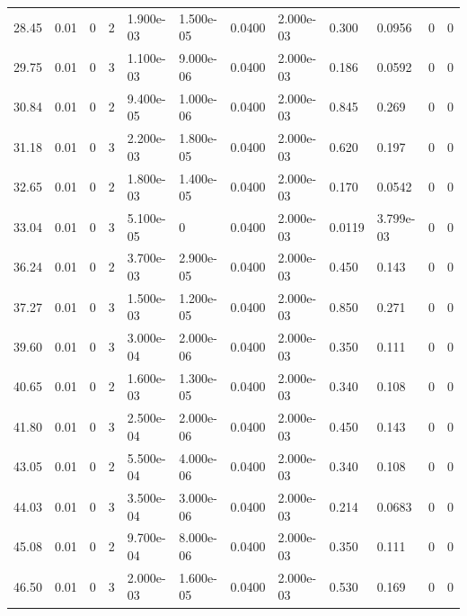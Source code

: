 \documentclass[preview]{standalone}
\begin{document}
{{\begin{tabular}{L{1.2cm}C{1.2cm} C{0.3cm}C{0.5cm} C{1.4cm}C{1.4cm} C{1.4cm}C{1.4cm} C{1.6cm}C{1.6cm} C{1.6cm}C{1.6cm}}
  28.45  &  0.01  & 0     &  2 &  1.900e-03  & 1.500e-05  &  0.0400&   2.000e-03& 0.300 & 0.0956   &  0 & 0  \\ 
  29.75  &  0.01  & 0     &  3 &  1.100e-03  & 9.000e-06  &  0.0400&   2.000e-03& 0.186 & 0.0592   &  0 & 0  \\ 
  30.84  &  0.01  & 0     &  2 &  9.400e-05  & 1.000e-06  &  0.0400&   2.000e-03& 0.845 & 0.269   &  0 & 0  \\ 
  31.18  &  0.01  & 0     &  3 &  2.200e-03  & 1.800e-05  &  0.0400&   2.000e-03& 0.620 & 0.197   &  0 & 0  \\ 
  32.65  &  0.01  & 0     &  2 &  1.800e-03  & 1.400e-05  &  0.0400&   2.000e-03& 0.170 & 0.0542   &  0 & 0  \\ 
  33.04  &  0.01  & 0     &  3 &  5.100e-05  & 0  &  0.0400&   2.000e-03& 0.0119 & 3.799e-03   &  0 & 0  \\ 
  36.24  &  0.01  & 0     &  2 &  3.700e-03  & 2.900e-05  &  0.0400&   2.000e-03& 0.450 & 0.143   &  0 & 0  \\ 
  37.27  &  0.01  & 0     &  3 &  1.500e-03  & 1.200e-05  &  0.0400&   2.000e-03& 0.850 & 0.271   &  0 & 0  \\ 
  39.60  &  0.01  & 0     &  3 &  3.000e-04  & 2.000e-06  &  0.0400&   2.000e-03& 0.350 & 0.111   &  0 & 0  \\ 
  40.65  &  0.01  & 0     &  2 &  1.600e-03  & 1.300e-05  &  0.0400&   2.000e-03& 0.340 & 0.108   &  0 & 0  \\ 
  41.80  &  0.01  & 0     &  3 &  2.500e-04  & 2.000e-06  &  0.0400&   2.000e-03& 0.450 & 0.143   &  0 & 0  \\ 
  43.05  &  0.01  & 0     &  2 &  5.500e-04  & 4.000e-06  &  0.0400&   2.000e-03& 0.340 & 0.108   &  0 & 0  \\ 
  44.03  &  0.01  & 0     &  3 &  3.500e-04  & 3.000e-06  &  0.0400&   2.000e-03& 0.214 & 0.0683   &  0 & 0  \\ 
  45.08  &  0.01  & 0     &  2 &  9.700e-04  & 8.000e-06  &  0.0400&   2.000e-03& 0.350 & 0.111   &  0 & 0  \\ 
  46.50  &  0.01  & 0     &  3 &  2.000e-03  & 1.600e-05  &  0.0400&   2.000e-03& 0.530 & 0.169   &  0 & 0  \\ 
\hline 
\end{tabular} 

}}
\end{document}
